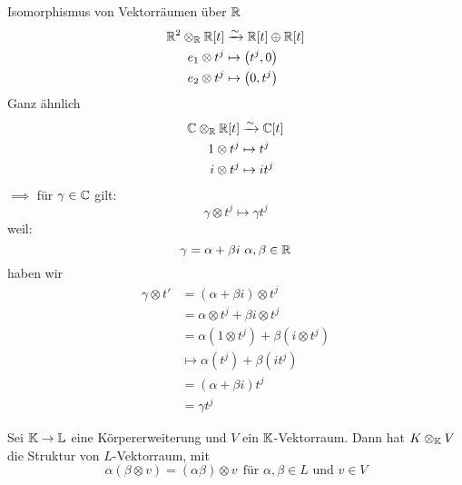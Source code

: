 \begin{Bsp}{Isomorphismus von Vektorräumen über $\mathbb{R}$}
  \begin{align*}
    \mathbb{R}^2\otimes_{\mathbb{R}}\mathbb{R}[t]&\xrightarrow{\sim}\mathbb{R}[t]\oplus\mathbb{R}[t]\\
    e_1\otimes t^j&\mapsto\left( t^j,0 \right)\\
    e_2\otimes t^j&\mapsto\left( 0,t^j \right)
  \end{align*}
  Ganz ähnlich
  \begin{align*}
    \mathbb{C}\otimes_{\mathbb{R}}\mathbb{R}[t]&\xrightarrow{\sim}\mathbb{C}[t]\\
    1\otimes t^j&\mapsto t^j\\
    i\otimes t^j&\mapsto it^j
  \end{align*}
  $\implies$ für $\gamma\in \mathbb{C}$ gilt:
  \[\gamma\otimes t^j\mapsto \gamma t^j\]
  weil: 
  \[\gamma=\alpha+\beta i\ \alpha,\beta\in \mb{R}\]
  haben wir
  \begin{align*}
    \gamma \otimes t'&=\left( \alpha+\beta i \right)\otimes t^j\\
    &=\alpha\otimes t^j+\beta i\otimes t^j\\
    &=\alpha\left( 1\otimes t^j \right)+\beta\left( i\otimes t^j \right)\\
    &\mapsto \alpha\left( t^j \right)+\beta(it^j)\\
    &=\left( \alpha+\beta i \right)t^j\\
    &=\gamma t^j
  \end{align*}
\end{Bsp}
\begin{Prop}
  Sei $\mathbb{K}\to\mathbb{L}$ eine Körpererweiterung und $V$ ein $\mathbb{K}$-Vektorraum. Dann hat $K\otimes_{\mathbb{K}}V$ die Struktur von $L$-Vektorraum, mit
  \[\alpha\left( \beta\otimes v \right)=\left( \alpha\beta \right)\otimes v\ \ \text{für $\alpha,\beta\in L$ und $v\in V$}\]
\end{Prop}
